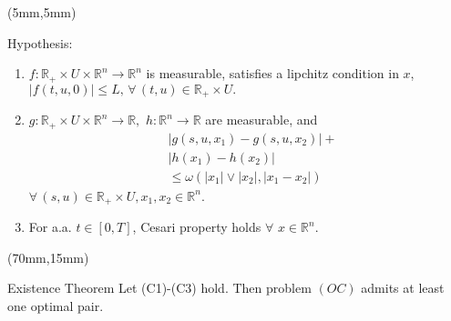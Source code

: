 \begin{frame}[plain]
	\begin{textblock*}{60mm}(5mm,5mm)
		\begin{graybox}{Hypothesis:}
			\begin{enumerate}[(\textbf{{C}}-1)]
				\item
					$
					f:\mathbb{R}_{+}\times U
					\times \mathbb{R}^n\rightarrow 
					\mathbb{R}^n
					$ is measurable, satisfies a lipchitz
					condition in $x$,
					$
					|f(t,u,0)|\leq L,\,
					\forall\,(t,u)\in
					\mathbb{R}_{+}\times U .
					$
				\item
					$
					g:\mathbb{R}_{+}\times U\times 
					\mathbb{R}^n\rightarrow \mathbb{R},
					$ 
					$
					h:\mathbb{R}^n\rightarrow \mathbb{R}
					$ are measurable, and
					\begin{align*}
					&|g(s,u,x_1)-g(s,u,x_2)|+\\
					&|h(x_1)-h(x_2)|\\
					&\leq \omega(|x_1|\vee |x_2|,|x_1-x_2|)
					\end{align*}
					$
					\forall\, (s,u)\in \mathbb{R}_{+}
					\times U,x_1,x_2\in \mathbb{R}^n
					$.
				\item
					For a.a. $t\in[0,T]$, Cesari property holds $\forall$ $x\in 
					\mathbb{R}^n$.
			\end{enumerate}	
		\end{graybox}
	\end{textblock*}


	
	\begin{textblock*}{55mm}(70mm,15mm)
		\begin{graybox}{Existence Theorem}
			Let (C1)-(C3) hold. Then problem $(OC)$ admits at least one optimal 
			pair.
		\end{graybox}
	\end{textblock*}
\end{frame}
